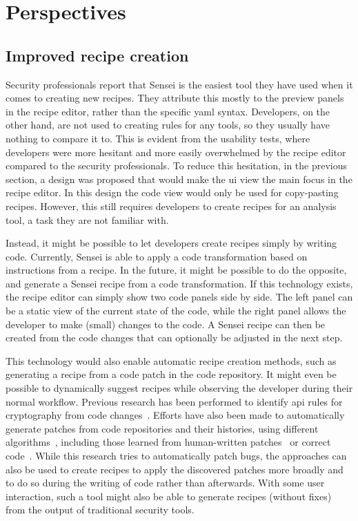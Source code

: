 \section{Perspectives}
\label{sec:sensei-perspectives}

\subsection{Improved recipe creation}
\label{sec:improvedrulecreation}
Security professionals report that Sensei is the easiest tool they have used when it comes to creating new recipes.
They attribute this mostly to the preview panels in the recipe editor, rather than the specific \gls{yaml} syntax.
Developers, on the other hand, are not used to creating rules for any tools, so they usually have nothing to compare it to.
This is evident from the usability tests, where developers were more hesitant and more easily overwhelmed by the recipe editor compared to the security professionals.
To reduce this hesitation, in the previous section, a design was proposed that would make the \gls{ui} view the main focus in the recipe editor.
In this design the code view would only be used for copy-pasting recipes.
However, this still requires developers to create recipes for an analysis tool, a task they are not familiar with.

Instead, it might be possible to let developers create recipes simply by writing code.
Currently, Sensei is able to apply a code transformation based on instructions from a recipe.
In the future, it might be possible to do the opposite, and generate a Sensei recipe from a code transformation.
If this technology exists, the recipe editor can simply show two code panels side by side.
The left panel can be a static view of the current state of the code, while the right panel allows the developer to make (small) changes to the code.
A Sensei recipe can then be created from the code changes that can optionally be adjusted in the next step.

This technology would also enable automatic recipe creation methods, such as generating a recipe from a code patch in the code repository.
It might even be possible to dynamically suggest recipes while observing the developer during their normal workflow.
Previous research has been performed to identify \gls{api} rules for cryptography from code changes~\cite{paletov2018inferring}.
Efforts have also been made to automatically generate patches from code repositories and their histories, using different algorithms~\cite{weimer2009automatically}, including those learned from human-written patches~\cite{kim2013automatic} or correct code~\cite{long2016automatic}.
While this research tries to automatically patch bugs, the approaches can also be used to create recipes to apply the discovered patches more broadly and to do so during the writing of code rather than afterwards.
With some user interaction, such a tool might also be able to generate recipes (without fixes) from the output of traditional security tools.

